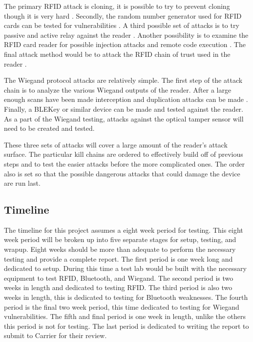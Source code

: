 \documentclass[10pt,twocolumn,letterpaper]{article}
\begin{document}
The primary RFID attack is cloning, it is possible to try to prevent cloning though it is very hard \cite{7888545} \cite{dijkPortableBumping} \cite{mitrokotsa09} \cite{7945583}.  Secondly, the random number generator used for RFID cards can be tested for vulnerabilities \cite{6565237} \cite{mitrokotsa09}. A third possible set of attacks is to try passive and active relay against the reader \cite{hancke2009confidence} \cite{6810722}.  Another possibility is to examine the RFID card reader for possible injection attacks and remote code execution \cite{garciaIClass}.  The final attack method would be to attack the RFID chain of trust used in the reader \cite{lehtonen07}.

The Wiegand protocol attacks are relatively simple.  The first step of the attack chain is to analyze the various Wiegand outputs of the reader.  After a large enough scans have been made interception and duplication attacks can be made \cite{chung2017wiegand}. Finally, a BLEKey \cite{baseggio2015BLEKey} or similar device can be made and tested against the reader.  As a part of the Wiegand testing, attacks against the optical tamper sensor will need to be created and tested.

These three sets of attacks will cover a large amount of the reader's attack surface.  The particular kill chains are ordered to effectively build off of previous steps and to test the easier attacks before the more complicated ones.  The order also is set so that the possible dangerous attacks that could damage the device are run last.

\subsection{Timeline}
The timeline for this project assumes a eight week period for testing.  This eight week period will be broken up into five separate stages for setup, testing, and wrapup.  Eight weeks should be more than adequate to perform the necessary testing and provide a complete report.  The first period is one week long and dedicated to setup.  During this time a test lab would be built with the necessary equipment to test RFID, Bluetooth, and Wiegand.  The second period is two weeks in length and dedicated to testing RFID.  The third period is also two weeks in length, this is dedicated to testing for Bluetooth weaknesses.  The fourth period is the final two week period, this time dedicated to testing for Wiegand vulnerabilities.  The fifth and final period is one week in length, unlike the others this period is not for testing.  The last period is dedicated to writing the report to submit to Carrier for their review.
\end{document}
